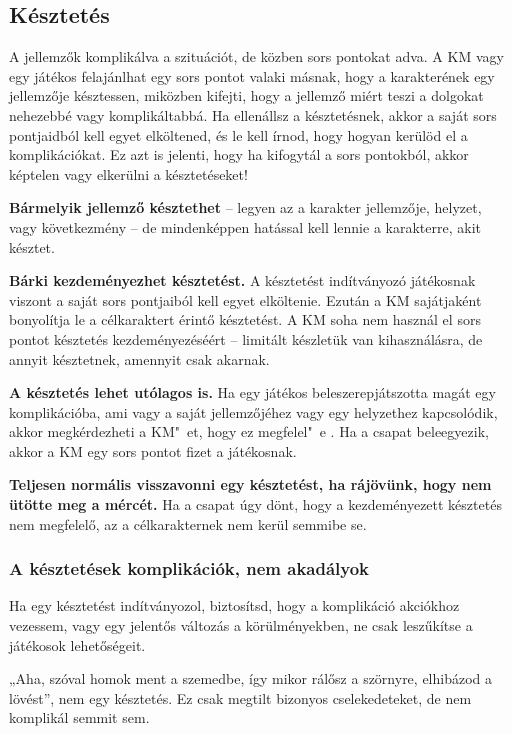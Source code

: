 \subsection{Késztetés}

A jellemzők  komplikálva a szituációt, de közben sors pontokat adva. A KM vagy egy játékos felajánlhat egy sors pontot valaki másnak, hogy a karakterének egy jellemzője késztessen, miközben kifejti, hogy a jellemző miért teszi a dolgokat nehezebbé vagy komplikáltabbá. Ha ellenállsz a késztetésnek, akkor a saját sors pontjaidból kell egyet elköltened, és le kell írnod, hogy hogyan kerülöd el a komplikációkat. Ez azt is jelenti, hogy ha kifogytál a sors pontokból, akkor képtelen vagy elkerülni a késztetéseket!

\textbf{Bármelyik jellemző késztethet} – legyen az a karakter jellemzője, helyzet, vagy következmény – de mindenképpen hatással kell lennie a karakterre, akit késztet.

\textbf{Bárki kezdeményezhet késztetést.} A késztetést indítványozó játékosnak viszont a saját sors pontjaiból kell egyet elköltenie. Ezután a KM sajátjaként bonyolítja le a célkaraktert érintő késztetést. A KM soha nem használ el sors pontot késztetés kezdeményezéséért – limitált készletük van kihasználásra, de annyit késztetnek, amennyit csak akarnak.

\textbf{A késztetés lehet utólagos is.} Ha egy játékos beleszerepjátszotta magát egy komplikációba, ami vagy a saját jellemzőjéhez vagy egy helyzethez kapcsolódik, akkor megkérdezheti a KM"~et, hogy ez megfelel"~e . Ha a csapat beleegyezik, akkor a KM egy sors pontot fizet a játékosnak.

\textbf{Teljesen normális visszavonni egy késztetést, ha rájövünk, hogy nem ütötte meg a mércét.} Ha a csapat úgy dönt, hogy a kezdeményezett késztetés nem megfelelő, az a célkarakternek nem kerül semmibe se.

\subsubsection{A késztetések komplikációk, nem akadályok}

Ha egy késztetést indítványozol, biztosítsd, hogy a komplikáció akciókhoz vezessem, vagy egy jelentős változás a körülményekben, ne csak leszűkítse a játékosok lehetőségeit.

„Aha, szóval homok ment a szemedbe, így mikor rálősz a szörnyre, elhibázod a lövést”, nem egy késztetés. Ez csak megtilt bizonyos cselekedeteket, de nem komplikál semmit sem.

